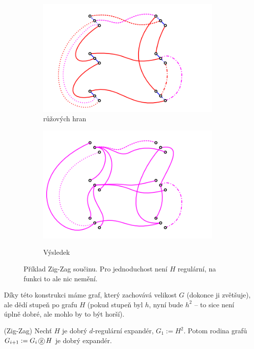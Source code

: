 \begin{figure}
\begin{subfigure}{7.5cm}{\includegraphics[width=\textwidth]{img/zigzag3.png}}
{růžových hran}\end{subfigure}
\begin{subfigure}{7.5cm}{\includegraphics[width=\textwidth]{img/zigzag4.png}}\caption{Výsledek}\end{subfigure}
\caption{Příklad Zig-Zag součinu. Pro jednoduchost není $H$ regulární, na funkci
to ale nic nemění.}
\label{zigzag-konstrukce}
\end{figure}

\poz Díky této konstrukci máme graf, který zachovává velikost $G$ (dokonce ji 
zvětšuje), ale dědí stupeň po grafu $H$ (pokud stupeň byl $h$, nyní bude $h^2$ 
-- to sice není úplně dobré, ale mohlo by to být horší).

\vt (Zig-Zag) Nechť $H$ je dobrý $d$-regulární expandér, $G_1 := H^2$. Potom 
rodina grafů $G_{i+1} := G_i\zz H$ je dobrý expandér.
